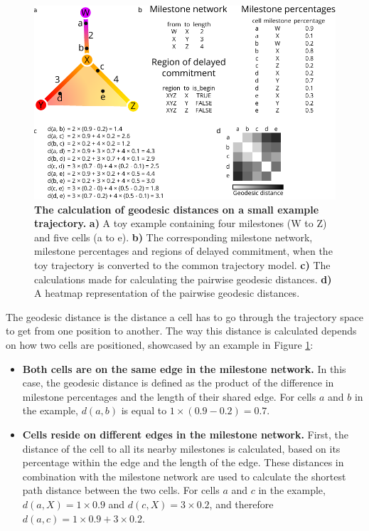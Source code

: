 \begin{figure}[tbh!]
	\centering\includegraphics[width=\linewidth]{fig/snote1fig_4.pdf}
	\caption{
		\textbf{The calculation of geodesic distances on a small example trajectory.}
		\textbf{a)} A toy example containing four milestones (W to Z) and five cells (a to e). \textbf{b)} The corresponding milestone network, milestone percentages and regions of delayed commitment, when the toy trajectory is converted to the common trajectory model. \textbf{c)} The calculations made for calculating the pairwise geodesic distances. \textbf{d)} A heatmap representation of the pairwise geodesic distances.
	}
	\label{fig:snote1fig_4}
\end{figure}

The geodesic distance is the distance a cell has to go through the trajectory space to get from one position to another. The way this distance is calculated depends on how two cells are positioned, showcased by an example in Figure \ref{fig:snote1fig_4}:

\begin{itemize}
	\item \textbf{Both cells are on the same edge in the milestone network.} In this case, the geodesic distance is defined as the product of the difference in milestone percentages and the length of their shared edge. For cells $a$ and $b$ in the example, $d(a, b)$ is equal to $1 \times (0.9 - 0.2) = 0.7$.
	\item \textbf{Cells reside on different edges in the milestone network.} First, the distance of the cell to all its nearby milestones is calculated, based on its percentage within the edge and the length of the edge. These distances in combination with the milestone network are used to calculate the shortest path distance between the two cells. For cells $a$ and $c$ in the example, $d(a, X) = 1 \times 0.9$ and $d(c, X) = 3 \times 0.2$, and therefore $d(a, c) = 1 \times 0.9 + 3 \times 0.2$. 
\end{itemize}


